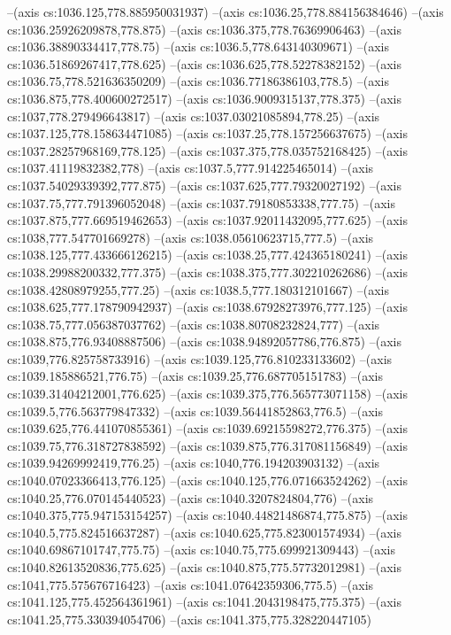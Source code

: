 --(axis cs:1036.125,778.885950031937)
--(axis cs:1036.25,778.884156384646)
--(axis cs:1036.25926209878,778.875)
--(axis cs:1036.375,778.76369906463)
--(axis cs:1036.38890334417,778.75)
--(axis cs:1036.5,778.643140309671)
--(axis cs:1036.51869267417,778.625)
--(axis cs:1036.625,778.52278382152)
--(axis cs:1036.75,778.521636350209)
--(axis cs:1036.77186386103,778.5)
--(axis cs:1036.875,778.400600272517)
--(axis cs:1036.9009315137,778.375)
--(axis cs:1037,778.279496643817)
--(axis cs:1037.03021085894,778.25)
--(axis cs:1037.125,778.158634471085)
--(axis cs:1037.25,778.157256637675)
--(axis cs:1037.28257968169,778.125)
--(axis cs:1037.375,778.035752168425)
--(axis cs:1037.41119832382,778)
--(axis cs:1037.5,777.914225465014)
--(axis cs:1037.54029339392,777.875)
--(axis cs:1037.625,777.79320027192)
--(axis cs:1037.75,777.791396052048)
--(axis cs:1037.79180853338,777.75)
--(axis cs:1037.875,777.669519462653)
--(axis cs:1037.92011432095,777.625)
--(axis cs:1038,777.547701669278)
--(axis cs:1038.05610623715,777.5)
--(axis cs:1038.125,777.433666126215)
--(axis cs:1038.25,777.424365180241)
--(axis cs:1038.29988200332,777.375)
--(axis cs:1038.375,777.302210262686)
--(axis cs:1038.42808979255,777.25)
--(axis cs:1038.5,777.180312101667)
--(axis cs:1038.625,777.178790942937)
--(axis cs:1038.67928273976,777.125)
--(axis cs:1038.75,777.056387037762)
--(axis cs:1038.80708232824,777)
--(axis cs:1038.875,776.93408887506)
--(axis cs:1038.94892057786,776.875)
--(axis cs:1039,776.825758733916)
--(axis cs:1039.125,776.810233133602)
--(axis cs:1039.185886521,776.75)
--(axis cs:1039.25,776.687705151783)
--(axis cs:1039.31404212001,776.625)
--(axis cs:1039.375,776.565773071158)
--(axis cs:1039.5,776.563779847332)
--(axis cs:1039.56441852863,776.5)
--(axis cs:1039.625,776.441070855361)
--(axis cs:1039.69215598272,776.375)
--(axis cs:1039.75,776.318727838592)
--(axis cs:1039.875,776.317081156849)
--(axis cs:1039.94269992419,776.25)
--(axis cs:1040,776.194203903132)
--(axis cs:1040.07023366413,776.125)
--(axis cs:1040.125,776.071663524262)
--(axis cs:1040.25,776.070145440523)
--(axis cs:1040.3207824804,776)
--(axis cs:1040.375,775.947153154257)
--(axis cs:1040.44821486874,775.875)
--(axis cs:1040.5,775.824516637287)
--(axis cs:1040.625,775.823001574934)
--(axis cs:1040.69867101747,775.75)
--(axis cs:1040.75,775.699921309443)
--(axis cs:1040.82613520836,775.625)
--(axis cs:1040.875,775.57732012981)
--(axis cs:1041,775.575676716423)
--(axis cs:1041.07642359306,775.5)
--(axis cs:1041.125,775.452564361961)
--(axis cs:1041.2043198475,775.375)
--(axis cs:1041.25,775.330394054706)
--(axis cs:1041.375,775.328220447105)
